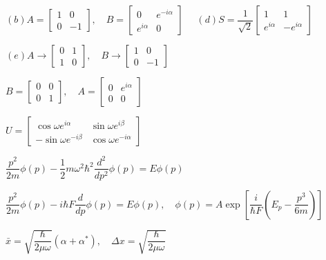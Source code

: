 \achapter

\answer $(b) A=\begin{bmatrix}
	1 & 0 \\	0 & -1
\end{bmatrix},\quad B=\begin{bmatrix}
	0 & e^{-i\alpha} \\ e^{i\alpha} & 0
\end{bmatrix}\quad $ $ (d) S=\dfrac{1}{\sqrt{2}}\begin{bmatrix}
	1 & 1 \\ e^{i\alpha} & -e^{i\alpha}
\end{bmatrix} $

 $ (e) A\rightarrow\begin{bmatrix}
	0 & 1 \\ 1 & 0
\end{bmatrix},\quad B\rightarrow\begin{bmatrix}
	1 & 0 \\ 0 & -1
\end{bmatrix} $

\answer $ B=\begin{bmatrix}
	0 & 0 \\ 0 & 1
\end{bmatrix},\quad A=\begin{bmatrix}
	0 & e^{i\alpha} \\ 0 & 0
\end{bmatrix} $

\answer $ U=\begin{bmatrix}
	\cos\omega e^{i\alpha} & \sin\omega e^{i\beta} \\
	-\sin\omega e^{-i\beta} & \cos\omega e^{-i\alpha}
\end{bmatrix} $

				

\answer $ \dfrac{p^{2}}{2m}\phi(p)-\dfrac{1}{2}m\omega^{2}\hbar^{2}\dfrac{d^{2}}{dp^{2}}\phi(p)=E\phi(p) $

\answer $ \dfrac{p^{2}}{2m}\phi(p)-i\hbar F\dfrac{d}{dp}\phi(p)=E\phi(p),\quad \phi(p)=A\exp\left[\dfrac{i}{\hbar F}\left(E_{p}-\dfrac{p^{3}}{6m}\right)\right] $

				

\answer $ \bar{x}=\sqrt{\dfrac{\hbar}{2\mu\omega}}(\alpha+\alpha^{*}),\quad \Delta x=\sqrt{\dfrac{\hbar}{2\mu\omega}} $

